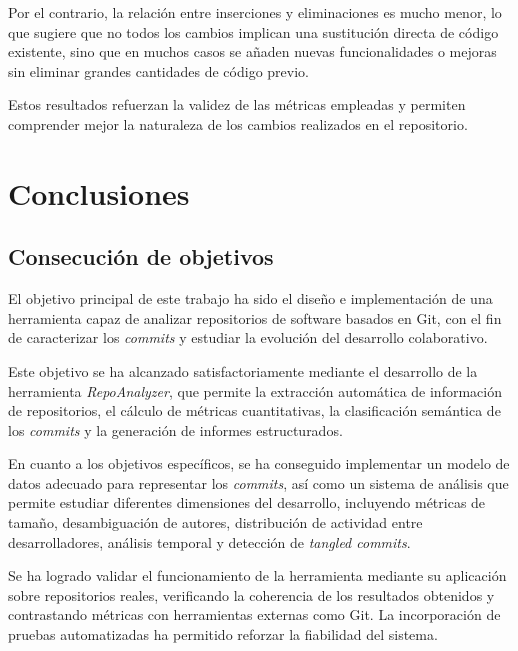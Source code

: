 \documentclass[a4paper, 12pt]{book}
\begin{document}
Por el contrario, la relación entre inserciones y eliminaciones es mucho menor, lo que sugiere que no todos los cambios implican una sustitución directa de código existente, sino que en muchos casos se añaden nuevas funcionalidades o mejoras sin eliminar grandes cantidades de código previo.

Estos resultados refuerzan la validez de las métricas empleadas y permiten comprender mejor la naturaleza de los cambios realizados en el repositorio.


\cleardoublepage
\chapter{Conclusiones}
\label{chap:conclusiones}


\section{Consecución de objetivos}
\label{sec:consecucion-objetivos}

El objetivo principal de este trabajo ha sido el diseño e implementación de una herramienta capaz de analizar repositorios de software basados en Git, con el fin de caracterizar los \emph{commits} y estudiar la evolución del desarrollo colaborativo.

Este objetivo se ha alcanzado satisfactoriamente mediante el desarrollo de la herramienta \emph{RepoAnalyzer}, que permite la extracción automática de información de repositorios, el cálculo de métricas cuantitativas, la clasificación semántica de los \emph{commits} y la generación de informes estructurados.

En cuanto a los objetivos específicos, se ha conseguido implementar un modelo de datos adecuado para representar los \emph{commits}, así como un sistema de análisis que permite estudiar diferentes dimensiones del desarrollo, incluyendo métricas de tamaño, desambiguación de autores, distribución de actividad entre desarrolladores, análisis temporal y detección de \emph{tangled commits}.

Se ha logrado validar el funcionamiento de la herramienta mediante su aplicación sobre repositorios reales, verificando la coherencia de los resultados obtenidos y contrastando métricas con herramientas externas como Git. La incorporación de pruebas automatizadas ha permitido reforzar la fiabilidad del sistema.
\end{document}
